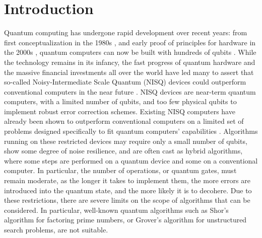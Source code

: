 \section{Introduction}

Quantum computing has undergone rapid development over recent years: from first conceptualization in the 1980s \cite{Benioff1980, Feynman1982}, and early proof of principles for hardware in the 2000s \cite{Chuang1998, Jones1999, Leung2000, Vandersypen2001, Haffner2005, Negrevergne2006, Plantenberg2007, Hanneke2009, Monz2011, Devitt2013, Devitt2016, Monz2016}, quantum computers can now be built with hundreds of qubits \cite{Jurcevic2021, Pino2021, Ebadi2021}. While the technology remains in its infancy, the fast progress of quantum hardware and the massive financial investments all over the world have led many to assert that so-called Noisy-Intermediate Scale Quantum (NISQ) devices \cite{preskillQuantumComputingNISQ2018, Brooks2019} could outperform conventional computers in the near future \cite{Arute2019, Zhong2020, Wu2021, Madsen2022}. NISQ devices are near-term quantum computers, with a limited number of qubits, and too few physical qubits to implement robust error correction schemes. Existing NISQ computers have already been shown to outperform conventional computers on a limited set of problems designed specifically to fit quantum computers' capabilities \cite{Arute2019, Zhong2020, Wu2021}. Algorithms running on these restricted devices may require only a small number of qubits, show some degree of noise resilience, and are often cast as hybrid algorithms, where some steps are performed on a quantum device and some on a conventional computer. In particular, the number of operations, or quantum gates, must remain moderate, as the longer it takes to implement them, the more errors are introduced into the quantum state, and the more likely it is to decohere. Due to these restrictions, there are severe limits on the scope of algorithms that can be considered. In particular, well-known quantum algorithms such as Shor's algorithm \cite{shorAlgorithmsQuantumComputation, Vandersypen2001, ChaoYang2007, Lanyon2007, Lucero2012, MartinLopez2012, Markov2013, Amico2019} for factoring prime numbers, or Grover's algorithm \cite{groverFastQuantumMechanical1996, Bennett1997, Cerf2000, Ambainis2004, Ambainis2007, Bernstein2010} for unstructured search problems, are not suitable.

